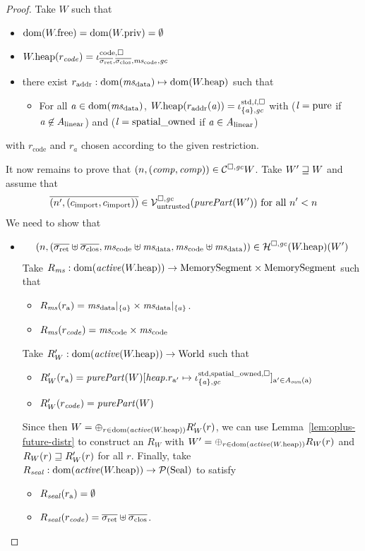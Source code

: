 \documentclass[a4paper]{article}
\begin{document}
\begin{proof}
  Take $W$ such that
  \begin{itemize}
  \item $\mathrm{dom}(W.\mathrm{free}) = \mathrm{dom}(W.\mathrm{priv}) = \emptyset$
  \item $\pwheap(r_\code) =  \codereg[\mathrm{code},\square]{\sigrets,\sigcloss,\mscode,\gc}$
  \item there exist $r_{\mathrm{addr}} : \dom(\msdata) \mapsto \dom(\pwheap)$ such that
    \begin{itemize}
    \item For all $\aaddr\in\dom(\msdata)$, $W.\mathrm{heap}(r_{\mathrm{addr}}(\mathit{a})) = \iota^{\mathrm{std},\mathit{l},\square}_{\{\mathit{a}\},\mathit{gc}}$ with ($\mathit{l} = \mathrm{pure}$ if $\mathit{a}\not\in A_{\mathrm{linear}}$) and ($\mathit{l} = \mathrm{spatial\_owned}$ if $\mathit{a}\in A_{\mathrm{linear}}$)
    \end{itemize}
  \end{itemize}
  with $r_{\mathrm{code}}$ and $r_a$ chosen according to the given restriction.
  
  It now remains to prove that $\left(n,(\mathit{comp},\mathit{comp})\right) \in \mathcal{C}^{\square,\mathit{gc}}{W}$.
  Take $W' \sqsupseteq W$ and assume that
  \begin{equation*}
    \overline{\npair[n']{(c_{\mathrm{import}},c_{\mathrm{import}})}} \in \lrv(\purePart{W'}) \text{ for all $n' < n$} 
  \end{equation*}
  We need to show that
  \begin{itemize}
  \item
    \begin{equation*}
      \npair{(\sigrets\uplus\sigcloss,\mscode\uplus \msdata, \mscode\uplus\msdata)} \in \lrheap(\pwheap)(W')
    \end{equation*}
   Take $R_\ms : \dom(\activeReg{\pwheap}) \fun \MemSeg \times \MemSeg$ such that
    \begin{itemize}
    \item $R_\ms(r_\addr) = \msdata|_{\{a\}} \times \msdata|_{\{a\}}$.
    \item $R_\ms(r_\var{code}) = \mscode\times\mscode$
    \end{itemize}
    Take $R_W' : \dom(\activeReg{\pwheap}) \fun \World$ such that
    \begin{itemize}
    \item $R_W'(r_\addr) = \purePart{W}[\var{heap}.r_{\addr'}\mapsto \stdreg{\{\aaddr\},\gc}{\spatialo}]_{\addr' \in A_\var{own}(\addr)}$ 
    \item $R_W'(r_\var{code}) = \purePart{W}$
    \end{itemize}
    Since then $W = \oplus_{r \in \dom(\activeReg{\pwheap})} R_W'(r)$, we can use Lemma~\ref{lem:oplus-future-distr} to construct an $R_W$ with  $W' = \oplus_{r \in \dom(\activeReg{\pwheap})} R_W(r)$ and $R_W(r) \sqsupseteq R_W'(r)$ for all $r$.
    Finally, take $R_\var{seal} : \dom(\activeReg{\pwheap}) \fun \powerset{\Seal}$ to satisfy
    \begin{itemize}
    \item $R_{\mathit{seal}}(r_{\mathrm{a}}) = \emptyset$
    \item $R_\var{seal}(r_\var{code}) = \sigrets\uplus \sigcloss$.
    \end{itemize}


\end{itemize}
\end{proof}
\end{document}

